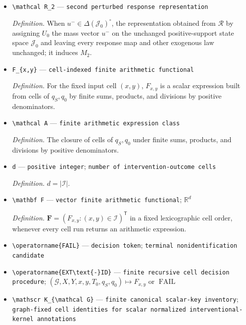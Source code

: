 \documentclass{article}
\begin{document}
\begin{itemize}
  \item \texttt{\textbackslash{}\allowbreak{}mathcal R\_\allowbreak{}2} --- \texttt{second perturbed response representation}
  \par\smallskip\noindent\emph{Definition.} When \(u^-\in\Delta(\mathcal J_0)^{\circ}\), the representation obtained from \(\mathcal R\) by assigning \(U_0\) the mass vector \(u^-\) on the unchanged positive-support state space \(\mathcal J_0\) and leaving every response map and other exogenous law unchanged; it induces \(M_2\).
  \item \texttt{F\_\allowbreak{}\{x,\allowbreak{}y\}\allowbreak{}} --- \texttt{cell-\allowbreak{}indexed finite arithmetic functional}
  \par\smallskip\noindent\emph{Definition.} For the fixed input cell \((x,y)\), \(F_{x,y}\) is a scalar expression built from cells of \(q_S,q_0\) by finite sums, products, and divisions by positive denominators.
  \item \texttt{\textbackslash{}\allowbreak{}mathcal A} --- \texttt{finite arithmetic expression class}
  \par\smallskip\noindent\emph{Definition.} The closure of cells of \(q_S,q_0\) under finite sums, products, and divisions by positive denominators.
  \item \texttt{d} --- \texttt{positive integer}; \texttt{number of intervention-\allowbreak{}outcome cells}
  \par\smallskip\noindent\emph{Definition.} \(d=\lvert\mathcal I\rvert\).
  \item \texttt{\textbackslash{}\allowbreak{}mathbf F} --- \texttt{vector finite arithmetic functional}; \(\mathbb R^d\)
  \par\smallskip\noindent\emph{Definition.} \(\mathbf F=(F_{x,y}:(x,y)\in\mathcal I)^{\mathsf T}\) in a fixed lexicographic cell order, whenever every cell run returns an arithmetic expression.
  \item \texttt{\textbackslash{}\allowbreak{}operatorname\{FAIL\}\allowbreak{}} --- \texttt{decision token}; \texttt{terminal nonidentification candidate}
  \item \texttt{\textbackslash{}\allowbreak{}operatorname\{EXT\textbackslash{}\allowbreak{}text\{-\allowbreak{}\}\allowbreak{}ID\}\allowbreak{}} --- \texttt{finite recursive cell decision procedure}; \((\mathcal G,X,Y,x,y,T_0,q_S,q_0)\mapsto F_{x,y}\text{ or }\operatorname{FAIL}\)
  \item \texttt{\textbackslash{}\allowbreak{}mathscr K\_\allowbreak{}\{\textbackslash{}\allowbreak{}mathcal G\}\allowbreak{}} --- \texttt{finite canonical scalar-\allowbreak{}key inventory}; \texttt{graph-\allowbreak{}fixed cell identities for scalar normalized interventional-\allowbreak{}kernel annotations}

\end{itemize}
\end{document}

